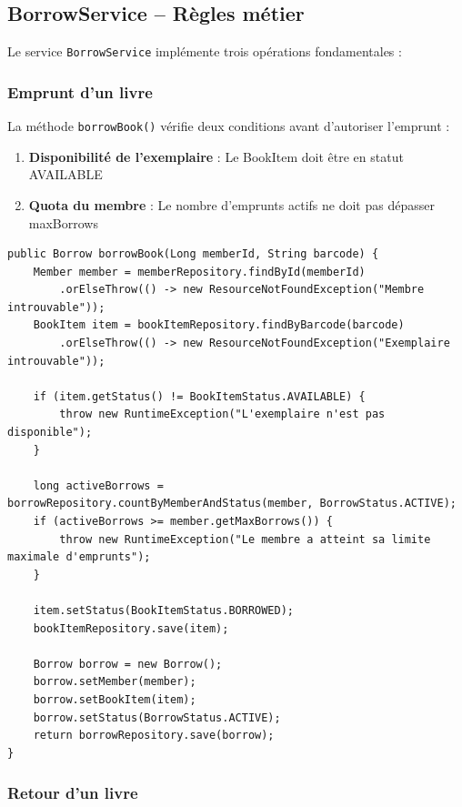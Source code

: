 \documentclass[12pt,a4paper,twoside]{report}
\begin{document}
\subsection{BorrowService -- Règles métier}

Le service \texttt{BorrowService} implémente trois opérations fondamentales :

\subsubsection{Emprunt d'un livre}

La méthode \texttt{borrowBook()} vérifie deux conditions avant d'autoriser l'emprunt :

\begin{enumerate}
    \item \textbf{Disponibilité de l'exemplaire} : Le BookItem doit être en statut AVAILABLE
    \item \textbf{Quota du membre} : Le nombre d'emprunts actifs ne doit pas dépasser maxBorrows
\end{enumerate}

\begin{lstlisting}[caption=Méthode borrowBook (extrait)]
public Borrow borrowBook(Long memberId, String barcode) {
    Member member = memberRepository.findById(memberId)
        .orElseThrow(() -> new ResourceNotFoundException("Membre introuvable"));
    BookItem item = bookItemRepository.findByBarcode(barcode)
        .orElseThrow(() -> new ResourceNotFoundException("Exemplaire introuvable"));

    if (item.getStatus() != BookItemStatus.AVAILABLE) {
        throw new RuntimeException("L'exemplaire n'est pas disponible");
    }

    long activeBorrows = borrowRepository.countByMemberAndStatus(member, BorrowStatus.ACTIVE);
    if (activeBorrows >= member.getMaxBorrows()) {
        throw new RuntimeException("Le membre a atteint sa limite maximale d'emprunts");
    }

    item.setStatus(BookItemStatus.BORROWED);
    bookItemRepository.save(item);

    Borrow borrow = new Borrow();
    borrow.setMember(member);
    borrow.setBookItem(item);
    borrow.setStatus(BorrowStatus.ACTIVE);
    return borrowRepository.save(borrow);
}
\end{lstlisting}

\subsubsection{Retour d'un livre}
\end{document}
